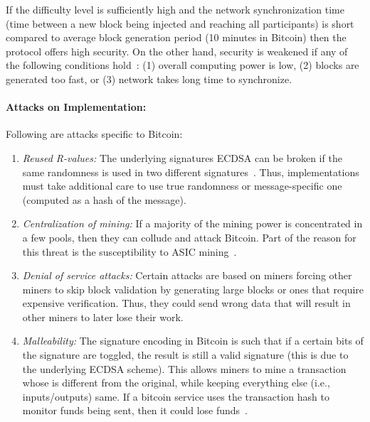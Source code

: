 \documentclass[]{report}   %
\begin{document}
If the difficulty level is sufficiently high and the network synchronization time (time between a new block being injected and reaching all participants) is short compared to average block generation period (10 minutes in Bitcoin) then the protocol offers high security. On the other hand, security is weakened if any of the following conditions hold~\cite{Garay2015}:
(1) overall computing power is low, (2) blocks are generated too fast, or (3) network takes long time to synchronize. 

\paragraph{Attacks on Implementation:} Following are attacks specific to Bitcoin:
\begin{enumerate}
	\item {\em Reused R-values:} The underlying signatures ECDSA can be broken if the same randomness is used in two different signatures~\cite{cryptoeprint:2013:734}. Thus, implementations must take additional care to use true randomness or message-specific one (computed as a hash of the message).
	\item {\em Centralization of mining:} If a majority of the mining power is concentrated in a few pools, then they can collude and attack Bitcoin. Part of the reason for this threat is the susceptibility to ASIC mining~\cite{Taylor:2013:BAB:2555729.2555745}.
	\item {\em Denial of service attacks:} Certain attacks are based on miners forcing other miners to skip block validation by generating large blocks or ones that require expensive verification. Thus, they could send wrong data that will result in other miners to later lose their work.
	\item {\em Malleability:} The signature encoding in Bitcoin is such that if a certain bits of the signature are toggled, the result is still a valid signature (this is due to the underlying ECDSA scheme). This allows miners to mine a transaction whose is different from the original, while keeping everything else (i.e., inputs/outputs) same. If a bitcoin service uses the transaction hash to monitor funds being sent, then it could lose funds~\cite{decker2014bitcoin}.
\end{enumerate}
\end{document}
